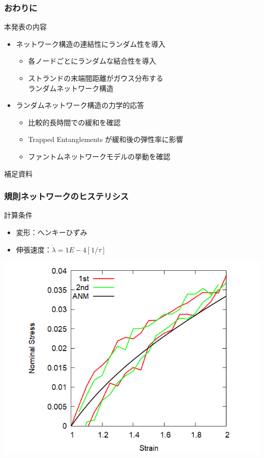 \documentclass[12pt, dvipdfmx]{beamer}
\begin{document}
\begin{frame}
	\frametitle{おわりに}
		\begin{block}{本発表の内容}
			\begin{itemize}
			\item ネットワーク構造の連結性にランダム性を導入
				\begin{itemize}
					\item 各ノードごとにランダムな結合性を導入
					\item ストランドの末端間距離がガウス分布する\\ランダムネットワーク構造
				\end{itemize}
			\item ランダムネットワーク構造の力学的応答
				\begin{itemize}
					\item 比較的長時間での緩和を確認
					\item Trapped Entanglements が緩和後の弾性率に影響 
					\item ファントムネットワークモデルの挙動を確認
				\end{itemize}
			\end{itemize}
		\end{block}
\end{frame}


\appendix

\begin{frame}
	\LARGE{補足資料}
\end{frame}


\begin{frame}
    \frametitle{規則ネットワークのヒステリシス}
        \begin{block}{計算条件}
            \begin{itemize}
                \item 変形：へンキーひずみ
                \item 伸張速度：$\dot{\lambda} = 1E-4 [1/\tau]$
            \end{itemize}
        \end{block}
        \begin{center}
            \includegraphics[width=.6\textwidth]{hyst_4chain_reg.png}
        \end{center}
\end{frame}
\end{document}

